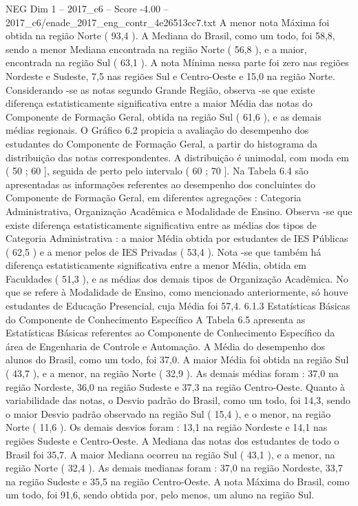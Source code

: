 \begin{textsample}{NEG Dim 1 – 2017\_c6 – Score -4.00 – 2017\_c6/enade\_2017\_eng\_contr\_4e26513cc7.txt}
A menor nota Máxima foi obtida na região Norte ( 93,4 ).
A Mediana do Brasil, como um todo, foi 58,8, sendo a menor Mediana encontrada na região Norte ( 56,8 ), e a maior, encontrada na região Sul ( 63,1 ).
A nota Mínima nessa parte foi zero nas regiões Nordeste e Sudeste, 7,5 nas regiões Sul e Centro-Oeste e 15,0 na região Norte.
Considerando -se as notas segundo Grande Região, observa -se que existe diferença estatisticamente significativa entre a maior Média das notas do Componente de Formação Geral, obtida na região Sul ( 61,6 ), e as demais médias regionais.
O Gráfico 6.2 propicia a avaliação do desempenho dos estudantes do Componente de Formação Geral, a partir do histograma da distribuição das notas correspondentes.
A distribuição é unimodal, com moda em ( 50 ; 60 ], seguida de perto pelo intervalo ( 60 ; 70 ].
Na Tabela 6.4 são apresentadas as informações referentes ao desempenho dos concluintes do Componente de Formação Geral, em diferentes agregações : Categoria Administrativa, Organização Acadêmica e Modalidade de Ensino.
Observa -se que existe diferença estatisticamente significativa entre as médias dos tipos de Categoria Administrativa : a maior Média obtida por estudantes de IES Públicas ( 62,5 ) e a menor pelos de IES Privadas ( 53,4 ).
Nota -se que também há diferença estatisticamente significativa entre a menor Média, obtida em Faculdades ( 51,3 ), e as médias dos demais tipos de Organização Acadêmica.
No que se refere à Modalidade de Ensino, como mencionado anteriormente, só houve estudantes de Educação Presencial, cuja Média foi 57,4. 6.1.3 Estatísticas Básicas do Componente de Conhecimento Específico A Tabela 6.5 apresenta as Estatísticas Básicas referentes ao Componente de Conhecimento Específico da área de Engenharia de Controle e Automação.
A Média do desempenho dos alunos do Brasil, como um todo, foi 37,0.
A maior Média foi obtida na região Sul ( 43,7 ), e a menor, na região Norte ( 32,9 ).
As demais médias foram : 37,0 na região Nordeste, 36,0 na região Sudeste e 37,3 na região Centro-Oeste.
Quanto à variabilidade das notas, o Desvio padrão do Brasil, como um todo, foi 14,3, sendo o maior Desvio padrão observado na região Sul ( 15,4 ), e o menor, na região Norte ( 11,6 ).
Os demais desvios foram : 13,1 na região Nordeste e 14,1 nas regiões Sudeste e Centro-Oeste.
A Mediana das notas dos estudantes de todo o Brasil foi 35,7.
A maior Mediana ocorreu na região Sul ( 43,1 ), e a menor, na região Norte ( 32,4 ).
As demais medianas foram : 37,0 na região Nordeste, 33,7 na região Sudeste e 35,5 na região Centro-Oeste.
A nota Máxima do Brasil, como um todo, foi 91,6, sendo obtida por, pelo menos, um aluno na região Sul.

\end{textsample}
